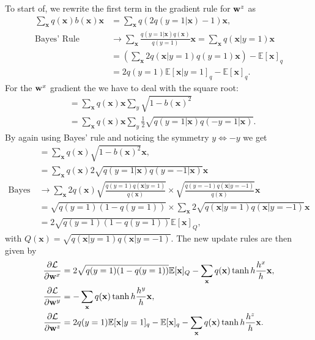\noindent To start of, we rewrite the first term in the gradient rule for $\mathbf{w}^{z}$ as
\begin{align*}
    \sum_{\mathbf{x}} q(\mathbf{x})  b(\mathbf{x})\mathbf{x} &= \sum_{\mathbf{x}} q (2 q(y=1|\mathbf{x}) - 1) \mathbf{x}, \\ 
    \text{Bayes' Rule } &\rightarrow \sum_{\mathbf{x}} \frac{q(y=1| \mathbf{x})q(\mathbf{x})}{q(y=1)}\mathbf{x} = \sum_{\mathbf{x}}q(\mathbf{x} | y=1) \mathbf{x}\\
    &= \left(\sum_{\mathbf{x}} 2q(\mathbf{x} | y=1) q(y=1)\mathbf{x}\right) - \mathbb{E}[\mathbf{x}]_{q}\\
    &= 2 q(y=1) \mathbb{E}[\mathbf{x}|y=1]_{q} - \mathbb{E}[\mathbf{x}]_{q}.
\end{align*}
For the $\mathbf{w}^{x}$ gradient the we have to deal with the square root:
\begin{align}
    &= \sum_{\mathbf{x}} q(\mathbf{x})\mathbf{x} \sum_y  \sqrt{1-b(\mathbf{x})^2}\nonumber \\
    &= \sum_{\mathbf{x}} q(\mathbf{x})\mathbf{x} \sum_y \frac{1}{2} \sqrt{q(y=1|\mathbf{x})q(-y=1|\mathbf{x})}\nonumber.
\end{align}
By again using Bayes' rule and noticing the symmetry $y\Leftrightarrow-y$ we get
\begin{align}
    &= \sum_{\mathbf{x}} q(\mathbf{x}) \sqrt{1-b(\mathbf{x})^2} \mathbf{x}\nonumber ,\\
    &=\sum_{\mathbf{x}} q(\mathbf{x})2 \sqrt{q(y=1|\mathbf{x})q(y=-1|\mathbf{x})}\mathbf{x}  \nonumber\\
    \text{Bayes Rule} &\rightarrow \sum_{\mathbf{x}} 2 q(\mathbf{x}) \sqrt{\frac{q(y=1)q(\mathbf{x} | y=1)}{q(\mathbf{x})}}  \times \sqrt{\frac{q(y=-1)q(\mathbf{x} | y=-1)}{q(\mathbf{x})}}  \mathbf{x}\nonumber\\
    & = \sqrt{q(y=1)(1-q(y=1))} \times \sum_{\mathbf{x}} 2 \sqrt{q(\mathbf{x} | y=1)q(\mathbf{x} | y=-1)}\mathbf{x} \nonumber\\
    &= 2 \sqrt{q(y=1)(1-q(y=1))} \mathbb{E}[\mathbf{x}]_{Q},
    \label{eq:bx_rewritten}
\end{align}
with $Q(\mathbf{x}) = \sqrt{q(\mathbf{x} | y=1)q(\mathbf{x} | y=-1)}$. The new update rules are then given by
\begin{align*}
    \frac{\partial \mathcal{L}}{\partial \mathbf{w}^{x}} &= 2\sqrt{q(y=1)(1-q(y=1))} \mathbb{E}[\mathbf{x}]_{Q} - \sum_{\mathbf{x}} q(\mathbf{x})\tanh{h} \frac{h^x}{h}\mathbf{x},\\
    \frac{\partial \mathcal{L}}{\partial \mathbf{w}^y} &= -\sum_{\mathbf{x}} q(\mathbf{x}) \tanh{h} \frac{h^y}{h} \mathbf{x},\\
    \frac{\partial \mathcal{L}}{\partial \mathbf{w}^z} &= 2 q(y=1) \mathbb{E}[\mathbf{x}|y=1]_{q} - \mathbb{E}[\mathbf{x}]_{q} - \sum_{\mathbf{x}} q(\mathbf{x}) \tanh{h} \frac{h^z}{h} \mathbf{x}.
\end{align*}
